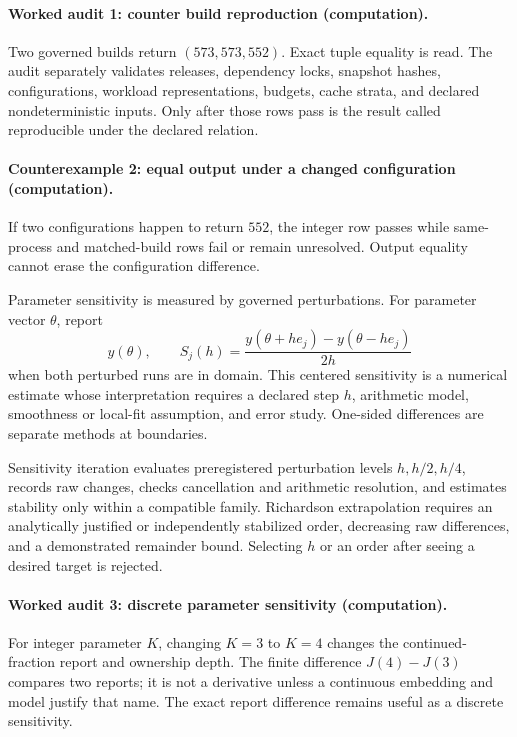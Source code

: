 \paragraph{Worked audit 1: counter build reproduction (computation).}
Two governed builds return \((573,573,552)\).  Exact tuple equality is read.  The audit separately validates releases,
dependency locks, snapshot hashes, configurations, workload representations, budgets, cache strata, and declared
nondeterministic inputs.  Only after those rows pass is the result called reproducible under the declared relation.

\paragraph{Counterexample 2: equal output under a changed configuration (computation).}
If two configurations happen to return \(552\), the integer row passes while same-process and matched-build rows fail
or remain unresolved.  Output equality cannot erase the configuration difference.

Parameter sensitivity is measured by governed perturbations.  For parameter vector \(\theta\), report
\[
                         y(\theta),\qquad
S_j(h)=\frac{y(\theta+he_j)-y(\theta-he_j)}{2h}
\]
when both perturbed runs are in domain.  This centered sensitivity is a numerical estimate whose interpretation
requires a declared step \(h\), arithmetic model, smoothness or local-fit assumption, and error study.  One-sided
differences are separate methods at boundaries.

Sensitivity iteration evaluates preregistered perturbation levels \(h,h/2,h/4\), records raw changes, checks
cancellation and arithmetic resolution, and estimates stability only within a compatible family.  Richardson
extrapolation requires an analytically justified or independently stabilized order, decreasing raw differences, and
a demonstrated remainder bound.  Selecting \(h\) or an order after seeing a desired target is rejected.

\paragraph{Worked audit 3: discrete parameter sensitivity (computation).}
For integer parameter \(K\), changing \(K=3\) to \(K=4\) changes the continued-fraction report and ownership depth.
The finite difference \(J(4)-J(3)\) compares two reports; it is not a derivative unless a continuous embedding and
model justify that name.  The exact report difference remains useful as a discrete sensitivity.

